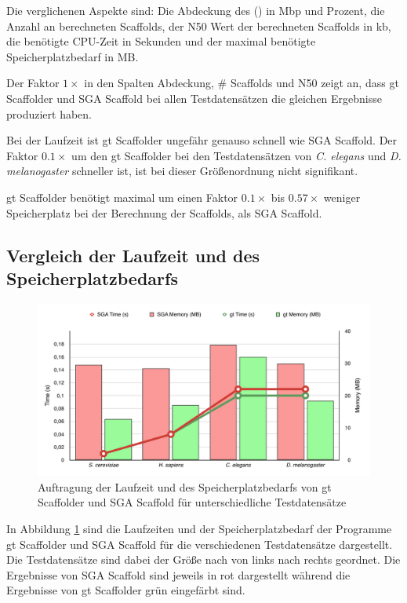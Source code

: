 \documentclass[a4paper,10pt,parskip]{scrartcl}
\begin{document}
Die verglichenen Aspekte sind: Die Abdeckung des () in Mbp und Prozent, die Anzahl an
berechneten Scaffolds, der N50 Wert der berechneten Scaffolds in kb,
die benötigte CPU-Zeit in Sekunden und der maximal benötigte
Speicherplatzbedarf in MB.

Der Faktor $1\times$ in den Spalten Abdeckung, \# Scaffolds und N50
zeigt an, dass gt Scaffolder und SGA Scaffold bei allen
Testdatensätzen die gleichen Ergebnisse produziert haben.

Bei der Laufzeit ist gt Scaffolder ungefähr genauso schnell wie SGA Scaffold. Der Faktor
$0.1\times$ um den gt Scaffolder bei den Testdatensätzen von
\textit{C. elegans} und \textit{D. melanogaster} schneller ist, ist
bei dieser Größenordnung nicht signifikant.

gt Scaffolder benötigt maximal um einen Faktor $0.1\times$ bis
$0.57\times$ weniger Speicherplatz bei der Berechnung der Scaffolds,
als SGA Scaffold.

\subsection{Vergleich der Laufzeit und des Speicherplatzbedarfs}
\begin{figure}[t]
  \includegraphics[width=\textwidth,height=0.8\textheight,keepaspectratio]{presentation/figures/sga_vs_gt.pdf}
  \caption{\label{abb: Zeit}Auftragung der Laufzeit und des
    Speicherplatzbedarfs von gt Scaffolder und SGA Scaffold für
    unterschiedliche Testdatensätze}
\end{figure}

In Abbildung \ref{abb: Zeit} sind die Laufzeiten und der
Speicherplatzbedarf der Programme gt Scaffolder und SGA Scaffold für
die verschiedenen Testdatensätze dargestellt. Die Testdatensätze sind
dabei der Größe nach von links nach rechts geordnet. Die Ergebnisse
von SGA Scaffold sind jeweils in rot dargestellt während die
Ergebnisse von gt Scaffolder grün eingefärbt sind.
\end{document}
